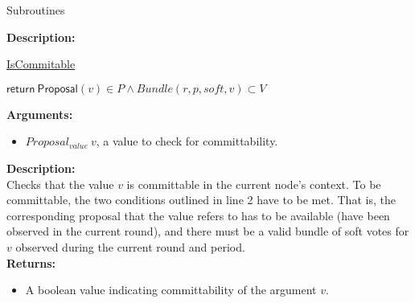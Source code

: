 \documentclass[10pt,a4paper]{article}
\begin{document}
\begin{section}{Subroutines}
\begin{algorithm}[H]
\begin{algorithmic}[1]


    \EndFunction
    \end{algorithmic}
\end{algorithm}

\noindent \textbf{Description:}\\


\begin{algorithm}[H]
    \caption{\underline{IsCommitable}}
    \label{algo:is-commitable}
    \begin{algorithmic}[1]

    \State $\mathsf{return} \ \mathsf{Proposal}(v) \in P \land Bundle(r,p,soft,v) \subset V$

    \EndFunction
    \end{algorithmic}
\end{algorithm}


\noindent \textbf{Arguments:}
\begin{itemize}
    \item $Proposal_{value} \ v$, a value to check for committability.
  \end{itemize}

\noindent \textbf{Description:}\\
Checks that the value $v$ is committable in the current node's context.
To be committable, the two conditions outlined in line 2 have to be met.
That is, the corresponding proposal that the value refers to has to be
available (have been observed in the current round), and there must
be a valid bundle of soft votes for $v$ observed during the current round and
period. \\

\noindent \textbf{Returns:}
\begin{itemize}
    \item A boolean value indicating committability of the argument $v$.
  \end{itemize}


\begin{algorithm}[H]
    \begin{algorithmic}[1]


\end{algorithmic}
\end{algorithm}
\end{section}
\end{document}
